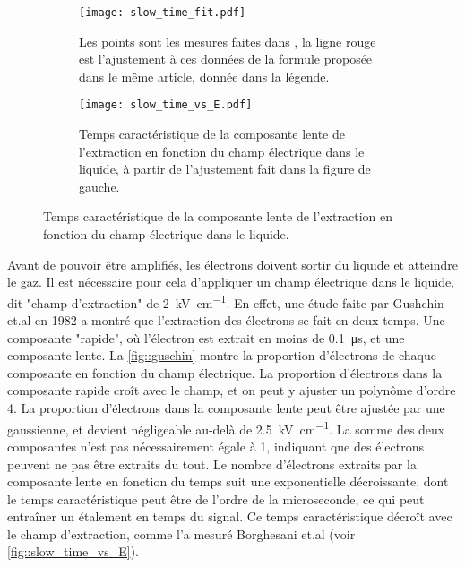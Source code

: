       \begin{figure}[htbp]
        \begin{subfigure}[t]{0.5\textwidth}
          \flushleft
          \captionsetup{width=.95\linewidth}
          \texttt{[image: slow\_time\_fit.pdf]}
          \caption{Les points sont les mesures faites dans \cite{Borghesani1990}, la ligne rouge est l'ajustement à ces données de la formule proposée dans le même article, donnée dans la légende.}
        \end{subfigure}
        \begin{subfigure}[t]{0.5\textwidth}
          \flushright        
          \captionsetup{width=.95\linewidth}
          \texttt{[image: slow\_time\_vs\_E.pdf]}
          \caption{Temps caractéristique de la composante lente de l'extraction en fonction du champ électrique dans le liquide, à partir de l'ajustement fait dans la figure de gauche.}
        \end{subfigure}
        \caption[Temps caractéristique de la composante lente de l'extraction en fonction du champ électrique.]{\label{fig::slow_time_vs_E}Temps caractéristique de la composante lente de l'extraction en fonction du champ électrique dans le liquide.}
      \end{figure}

      Avant de pouvoir être amplifiés, les électrons doivent sortir du liquide et atteindre le gaz. Il est nécessaire pour cela d'appliquer un champ électrique dans le liquide, dit "champ d'extraction" de \SI{2}{\kilo\volt\per\centi\meter}. En effet, une étude faite par Gushchin et.al en 1982\cite{guschin} a montré que l'extraction des électrons se fait en deux temps. Une composante "rapide", où l'électron est extrait en moins de \SI{0.1}{\micro\second}, et une composante lente.  La \autoref{fig::guschin} montre la proportion d'électrons de chaque composante en fonction du champ électrique. La proportion d'électrons dans la composante rapide croît avec le champ, et on peut y ajuster un polynôme d'ordre 4. La proportion d'électrons dans la composante lente peut être ajustée par une gaussienne, et devient négligeable au-delà de \SI{2.5}{\kilo\volt\per\centi\meter}. La somme des deux composantes n'est pas nécessairement égale à 1, indiquant que des électrons peuvent ne pas être extraits du tout. Le nombre d'électrons extraits par la composante lente en fonction du temps suit une exponentielle décroissante, dont le temps caractéristique peut être de l'ordre de la microseconde\cite{Borghesani1990}, ce qui peut entraîner un étalement en temps du signal. Ce temps caractéristique décroît avec le champ d'extraction, comme l'a mesuré Borghesani et.al\cite{Borghesani1990} (voir \autoref{fig::slow_time_vs_E}). %

